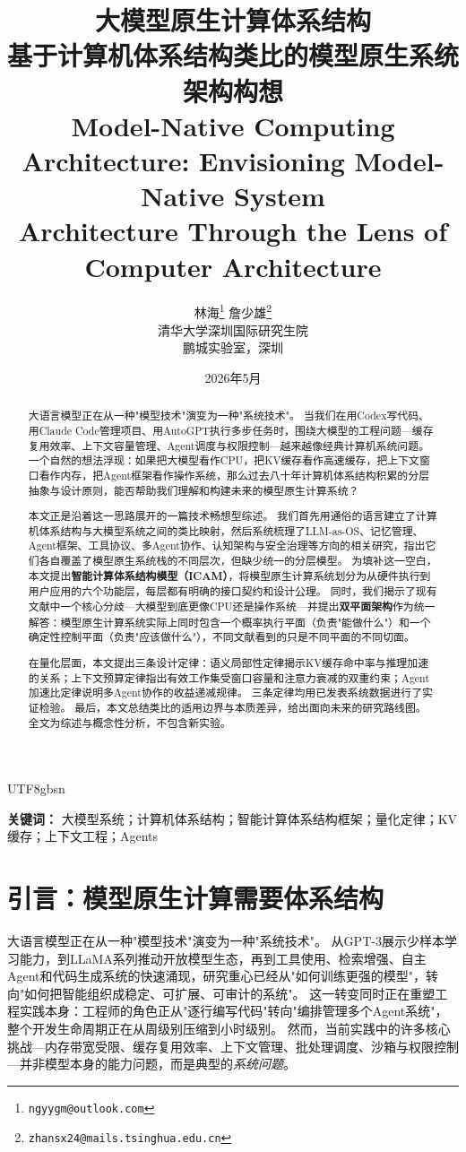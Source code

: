 \documentclass[11pt,a4paper]{article}
\title{\textbf{大模型原生计算体系结构}\\[6pt]
\large 基于计算机体系结构类比的模型原生系统架构构想\\[4pt]
\normalsize Model-Native Computing Architecture: Envisioning Model-Native System\\
Architecture Through the Lens of Computer Architecture}
\author{林海\thanks{\texttt{ngyygm@outlook.com}} \quad 詹少雄\thanks{\texttt{zhansx24@mails.tsinghua.edu.cn}}\\[4pt]
\small 清华大学深圳国际研究生院\\
鹏城实验室，深圳}
\date{2026年5月}
\begin{document}
\begin{CJK*}{UTF8}{gbsn}
\maketitle

\begin{abstract}
大语言模型正在从一种"模型技术"演变为一种"系统技术"。
当我们在用Codex写代码、用Claude Code管理项目、用AutoGPT执行多步任务时，围绕大模型的工程问题---缓存复用效率、上下文容量管理、Agent调度与权限控制---越来越像经典计算机系统问题。
一个自然的想法浮现：如果把大模型看作CPU，把KV缓存看作高速缓存，把上下文窗口看作内存，把Agent框架看作操作系统，那么过去八十年计算机体系结构积累的分层抽象与设计原则，能否帮助我们理解和构建未来的模型原生计算系统？

本文正是沿着这一思路展开的一篇技术畅想型综述。
我们首先用通俗的语言建立了计算机体系结构与大模型系统之间的类比映射，然后系统梳理了LLM-as-OS、记忆管理、Agent框架、工具协议、多Agent协作、认知架构与安全治理等方向的相关研究，指出它们各自覆盖了模型原生系统栈的不同层次，但缺少统一的分层模型。
为填补这一空白，本文提出\textbf{智能计算体系结构模型（ICAM）}，将模型原生计算系统划分为从硬件执行到用户应用的六个功能层，每层都有明确的接口契约和设计公理。
同时，我们揭示了现有文献中一个核心分歧---大模型到底更像CPU还是操作系统---并提出\textbf{双平面架构}作为统一解答：模型原生计算系统实际上同时包含一个概率执行平面（负责"能做什么"）和一个确定性控制平面（负责"应该做什么"），不同文献看到的只是不同平面的不同切面。

在量化层面，本文提出三条设计定律：语义局部性定律揭示KV缓存命中率与推理加速的关系；上下文预算定律指出有效工作集受窗口容量和注意力衰减的双重约束；Agent加速比定律说明多Agent协作的收益递减规律。
三条定律均用已发表系统数据进行了实证检验。
最后，本文总结类比的适用边界与本质差异，给出面向未来的研究路线图。
全文为综述与概念性分析，不包含新实验。
\end{abstract}

\textbf{关键词：} 大模型系统；计算机体系结构；智能计算体系结构框架；量化定律；KV缓存；上下文工程；Agents

\section{引言：模型原生计算需要体系结构}
\label{sec:intro}

大语言模型正在从一种"模型技术"演变为一种"系统技术"。
从GPT-3展示少样本学习能力\cite{brown2020gpt3}，到LLaMA系列推动开放模型生态\cite{llama2023}，再到工具使用\cite{schick2023toolformer}、检索增强\cite{lewis2020rag}、自主Agent\cite{yao2023react}和代码生成系统\cite{openhands_paper_2025,sweagent2024}的快速涌现，研究重心已经从"如何训练更强的模型"，转向"如何把智能组织成稳定、可扩展、可审计的系统"。
这一转变同时正在重塑工程实践本身：工程师的角色正从"逐行编写代码"转向"编排管理多个Agent系统"，整个开发生命周期正在从周级别压缩到小时级别\cite{anthropic2026agenticreport}。
然而，当前实践中的许多核心挑战---内存带宽受限\cite{gholami2024memorywall}、缓存复用效率\cite{kwon2023pagedattention}、上下文管理\cite{memgpt2023}、批处理调度\cite{orca2022}、沙箱与权限控制\cite{ironclaw2025}---并非模型本身的能力问题，而是典型的\emph{系统问题}。


\end{CJK*}
\end{document}
